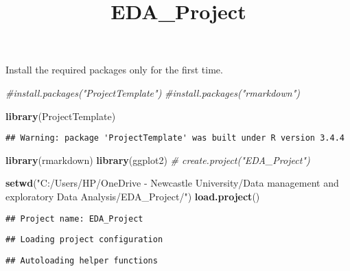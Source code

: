 \documentclass[]{article}
\title{EDA\_Project}
\author{}
\date{}
\newenvironment{Shaded}{\begin{snugshade}}{\end{snugshade}}
\newcommand{\KeywordTok}[1]{\textcolor[rgb]{0.13,0.29,0.53}{\textbf{#1}}}
\newcommand{\StringTok}[1]{\textcolor[rgb]{0.31,0.60,0.02}{#1}}
\newcommand{\CommentTok}[1]{\textcolor[rgb]{0.56,0.35,0.01}{\textit{#1}}}
\newcommand{\NormalTok}[1]{#1}
\begin{document}
\maketitle

Install the required packages only for the first time.

\begin{Shaded}
\begin{Highlighting}[]
\CommentTok{#install.packages("ProjectTemplate")}
\CommentTok{#install.packages("rmarkdown")}
\end{Highlighting}
\end{Shaded}

\begin{Shaded}
\begin{Highlighting}[]
\KeywordTok{library}\NormalTok{(ProjectTemplate)}
\end{Highlighting}
\end{Shaded}

\begin{verbatim}
## Warning: package 'ProjectTemplate' was built under R version 3.4.4
\end{verbatim}

\begin{Shaded}
\begin{Highlighting}[]
\KeywordTok{library}\NormalTok{(rmarkdown)}
\KeywordTok{library}\NormalTok{(ggplot2)}
\CommentTok{# create.project("EDA_Project")}
\end{Highlighting}
\end{Shaded}

\begin{Shaded}
\begin{Highlighting}[]
\KeywordTok{setwd}\NormalTok{(}\StringTok{"C:/Users/HP/OneDrive - Newcastle University/Data management and exploratory Data Analysis/EDA_Project/"}\NormalTok{)}
\KeywordTok{load.project}\NormalTok{()}
\end{Highlighting}
\end{Shaded}

\begin{verbatim}
## Project name: EDA_Project
\end{verbatim}

\begin{verbatim}
## Loading project configuration
\end{verbatim}

\begin{verbatim}
## Autoloading helper functions
\end{verbatim}
\end{document}
